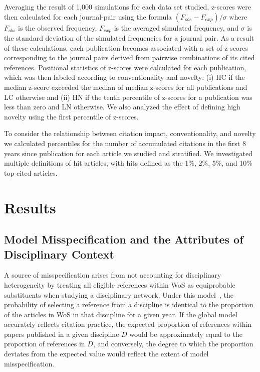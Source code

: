 \documentclass[NETN]{stjour}
\begin{document}
Averaging the result of 1,000 simulations for each data set studied, z-scores were then calculated for each journal-pair using the formula $(F_{obs} - F_{exp})/\sigma$ where $F_{obs}$ is the observed frequency, $F_{exp}$ is the averaged simulated frequency, and $\sigma$ is the standard deviation of the simulated frequencies for a journal pair. As a result of these calculations, each publication becomes associated with a set of z-scores corresponding to the journal pairs derived from pairwise combinations of its cited references. Positional statistics of z-scores were calculated for each publication, which was then labeled according to conventionality and novelty: (i) HC if the median z-score exceeded the median of median z-scores for all publications and LC otherwise and (ii) HN if the tenth percentile of z-scores for a publication was less than zero and LN otherwise. We also analyzed the effect of defining high novelty using the first percentile of z-scores.

To consider the relationship between citation impact, conventionality, and novelty we calculated percentiles for the number of accumulated citations in the first 8 years since publication for each article we studied and stratified. We investigated multiple definitions of hit articles, with hits defined as the 1\%, 2\%, 5\%, and 10\% top-cited articles.  

\section{Results}

\subsection{Model Misspecification and the Attributes of Disciplinary Context} 
A source of misspecification arises from not accounting for disciplinary heterogeneity by treating all eligible references within WoS as equiprobable substituents when studying a disciplinary network. Under this model~\citep{uzzi_atypical_2013}, the probability of selecting a reference from a discipline is identical to the proportion of the articles in WoS in that discipline for a given year.  If the global model accurately reflects citation practice, the expected proportion of references within papers published in a given discipline $D$ would be approximately equal to the proportion of references in  $D$, and conversely, the degree to which the proportion deviates from the expected value would reflect the extent of model misspecification. 
\end{document}
